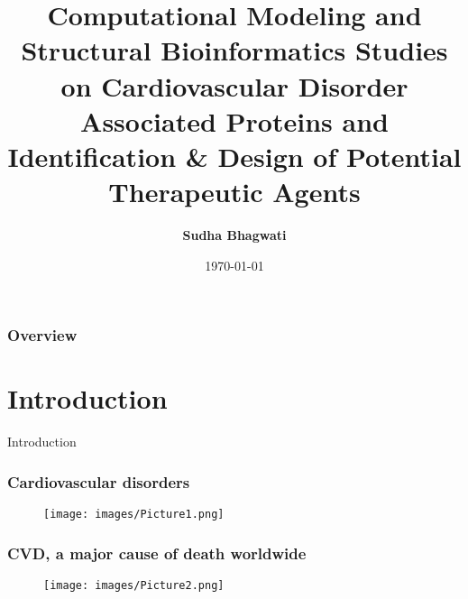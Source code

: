 \documentclass{beamer}
\title[PhD Oral Defense]{Computational Modeling and Structural Bioinformatics Studies on Cardiovascular Disorder Associated Proteins and Identification \& Design of Potential Therapeutic Agents} %
\author{\textbf{Sudha Bhagwati}} %
\institute[CSIR-CDRI, JNU] %
{
\small \textbf{Supervisor:}  Dr. Mohammad Imran Siddiqi (\emph{Sr. Principal Scientist}) \\ \vspace{0.5cm}
\small CSIR-Central Drug Research Institute \\ %
\medskip
Jawaharlal Nehru University, New Delhi \\ %
\medskip
\textit{sudhabhagwati@gmail.com} %
}
\date{\today} %
\begin{document}
\begin{frame}
\titlepage %
\end{frame}

\begin{frame}
\frametitle{Overview} %
\tableofcontents %
\end{frame}


\section{Introduction}

\begin{frame}
\begin{block}
\Huge{\centerline{Introduction}}
\end{block}
\end{frame}

\begin{frame}
\frametitle{\textbf{Cardiovascular disorders}}
\begin{figure}
\texttt{[image: images/Picture1.png]}
\end{figure}
\end{frame}

\begin{frame}
\frametitle{\textbf{CVD, a major cause of death worldwide}}
\begin{figure}
\texttt{[image: images/Picture2.png]}
\end{figure}
\end{frame}
\end{document}
